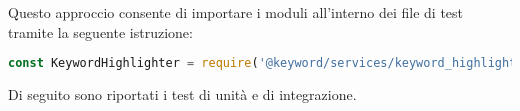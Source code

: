 \vspace{10pt}
\par\noindent Questo approccio consente di importare i moduli all’interno dei file di test tramite la seguente istruzione:

\vspace{10pt}
\begin{samepage}
\begin{lstlisting}[language=JavaScript]
  const KeywordHighlighter = require('@keyword/services/keyword_highlighter');
\end{lstlisting}
\end{samepage}

\vspace{10pt}
\par\noindent Di seguito sono riportati i test di unità e di integrazione.

